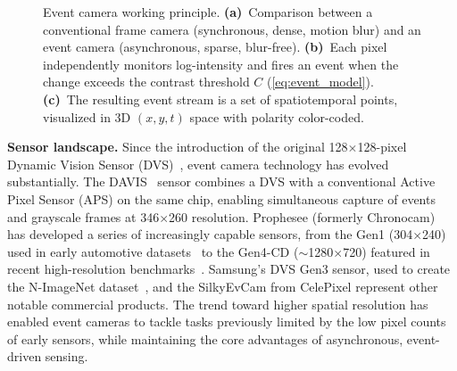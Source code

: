 \begin{figure}[t]
    \centering
    \caption{Event camera working principle. \textbf{(a)}~Comparison between a conventional frame camera (synchronous, dense, motion blur) and an event camera (asynchronous, sparse, blur-free). \textbf{(b)}~Each pixel independently monitors log-intensity and fires an event when the change exceeds the contrast threshold $C$ (\cref{eq:event_model}). \textbf{(c)}~The resulting event stream is a set of spatiotemporal points, visualized in 3D $(x, y, t)$ space with polarity color-coded.}
    \label{fig:event_principle}
\end{figure}

\noindent\textbf{Sensor landscape.} Since the introduction of the original 128$\times$128-pixel Dynamic Vision Sensor (DVS)~\cite{lichtsteiner2008dvs}, event camera technology has evolved substantially. The DAVIS~\cite{brandli2014davis} sensor combines a DVS with a conventional Active Pixel Sensor (APS) on the same chip, enabling simultaneous capture of events and grayscale frames at 346$\times$260 resolution. Prophesee (formerly Chronocam) has developed a series of increasingly capable sensors, from the Gen1 (304$\times$240) used in early automotive datasets~\cite{perot2020red} to the Gen4-CD ($\sim$1280$\times$720) featured in recent high-resolution benchmarks~\cite{gehrig2021dsec}. Samsung's DVS Gen3 sensor, used to create the N-ImageNet dataset~\cite{kim2021nimagenet}, and the SilkyEvCam from CelePixel represent other notable commercial products. The trend toward higher spatial resolution has enabled event cameras to tackle tasks previously limited by the low pixel counts of early sensors, while maintaining the core advantages of asynchronous, event-driven sensing.


